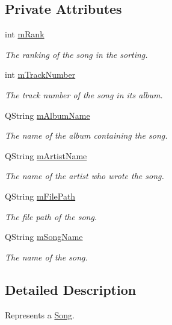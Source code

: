 \subsection*{Private Attributes}
\begin{DoxyCompactItemize}
\item 
int \mbox{\hyperlink{class_song_a18b47d2545fc5e7795cad143092c97e7}{m\+Rank}}
\begin{DoxyCompactList}\small\item\em The ranking of the song in the sorting. \end{DoxyCompactList}\item 
int \mbox{\hyperlink{class_song_a45f2f019180a08117bc1992f16fdb5f7}{m\+Track\+Number}}
\begin{DoxyCompactList}\small\item\em The track number of the song in its album. \end{DoxyCompactList}\item 
Q\+String \mbox{\hyperlink{class_song_aadf3ea14887a9c5a36a1fe419d7d6222}{m\+Album\+Name}}
\begin{DoxyCompactList}\small\item\em The name of the album containing the song. \end{DoxyCompactList}\item 
Q\+String \mbox{\hyperlink{class_song_a53eb13c6325e01434ee370ba2d9af292}{m\+Artist\+Name}}
\begin{DoxyCompactList}\small\item\em The name of the artist who wrote the song. \end{DoxyCompactList}\item 
Q\+String \mbox{\hyperlink{class_song_af6852312a9369340908b7726d97979a6}{m\+File\+Path}}
\begin{DoxyCompactList}\small\item\em The file path of the song. \end{DoxyCompactList}\item 
Q\+String \mbox{\hyperlink{class_song_af7fae22fdde85f62397c5a3618e8e573}{m\+Song\+Name}}
\begin{DoxyCompactList}\small\item\em The name of the song. \end{DoxyCompactList}\end{DoxyCompactItemize}


\subsection{Detailed Description}
Represents a \mbox{\hyperlink{class_song}{Song}}. 

